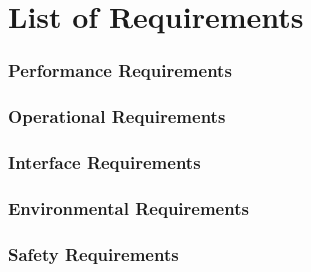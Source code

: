\chapter{List of Requirements}

\subsection*{Performance Requirements}

\subsection*{Operational Requirements}

\subsection*{Interface Requirements}

\subsection*{Environmental Requirements}

\subsection*{Safety Requirements}
\clearpage

